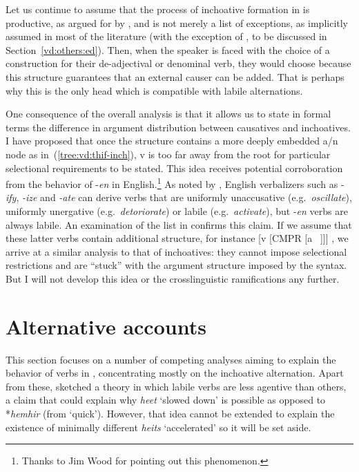 Let us continue to assume that the process of inchoative formation in {\thif} is productive, as argued for by \cite{lev16}, and is not merely a list of exceptions, as implicitly assumed in most of the literature (with the exception of \citealt{doron03}, to be discussed in Section~\ref{vd:others:ed}). Then, when the speaker is faced with the choice of a construction for their de-adjectival or denominal verb, they would choose {\vd} because this structure guarantees that an external causer can be added. That is perhaps why this is the only head which is compatible with labile alternations.

One consequence of the overall analysis is that it allows us to state in formal terms the difference in argument distribution between causatives and inchoatives. %
I have proposed that once the structure contains a more deeply embedded a/n node as in~(\ref{tree:vd:thif-inch}), v is too far away from the root for particular selectional requirements to be stated. This idea receives potential corroboration from the behavior of -\emph{en} in English.\footnote{Thanks to Jim Wood for pointing out this phenomenon.} As noted by \cite{harley09n}, English verbalizers such as -\emph{ify}, \emph{-ize} and \emph{-ate} can derive verbs that are uniformly unaccusative (e.g.~\emph{oscillate}), uniformly unergative (e.g.~\emph{detoriorate}) or labile (e.g.~\emph{activate}), but -\emph{en} verbs are always labile. An examination of the list in \citet[245]{levin93} confirms this claim. If we assume that these latter verbs contain additional structure, for instance [v [CMPR [a ~\!]]] \citep{bobaljik12}, we arrive at a similar analysis to that of {\thif} inchoatives: they cannot impose selectional restrictions and are ``stuck'' with the argument structure imposed by the syntax. But I will not develop this idea or the crosslinguistic ramifications any further.


\section{Alternative accounts} \label{vd:others}
This section focuses on a number of competing analyses aiming to explain the behavior of verbs in {\thif}, concentrating mostly on the inchoative alternation. Apart from these, \cite{lev16} sketched a theory in which labile verbs are less agentive than others, a claim that could explain why \emph{heet} `slowed down' is possible as opposed to *\emph{hemhir} (from `quick'). However, that idea cannot be extended to explain the existence of minimally different \emph{hei{ts}} `accelerated' so it will be set aside.

